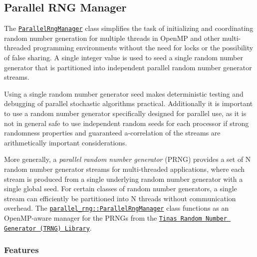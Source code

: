\href{https://travis-ci.org/markjolah/ParallelRngManager}{\tt } \subsection*{Parallel R\+NG Manager}

The \href{https://markjolah.github.io/ParallelRngManager/classparallel__rng_1_1ParallelRngManager.html}{\tt {\ttfamily Parallel\+Rng\+Manager}} class simplifies the task of initializing and coordinating random number generation for multiple threads in Open\+MP and other multi-\/threaded programming environments without the need for locks or the possibility of false sharing. A single integer value is used to seed a single random number generator that is partitioned into independent parallel random number generator streams.

Using a single random number generator seed makes deterministic testing and debugging of parallel stochastic algorithms practical. Additionally it is important to use a random number generator specifically designed for parallel use, as it is not in general safe to use independent random seeds for each processor if strong randomness properties and guaranteed a-\/correlation of the streams are arithmetically important considerations.

More generally, a {\itshape parallel random number generator} (P\+R\+NG) provides a set of N random number generator streams for multi-\/threaded applications, where each stream is produced from a single underlying random number generator with a single global seed. For certain classes of random number generators, a single stream can efficiently be partitioned into N threads without communication overhead. The \href{https://markjolah.github.io/ParallelRngManager/classparallel__rng_1_1ParallelRngManager.html}{\tt {\ttfamily parallel\+\_\+rng\+::\+Parallel\+Rng\+Manager}} class functions as an Open\+M\+P-\/aware manager for the P\+R\+N\+Gs from the \href{https://www.numbercrunch.de/trng/}{\tt Tina\textquotesingle{}s Random Number Generator (T\+R\+NG) Library}.

\subsubsection*{Features}


